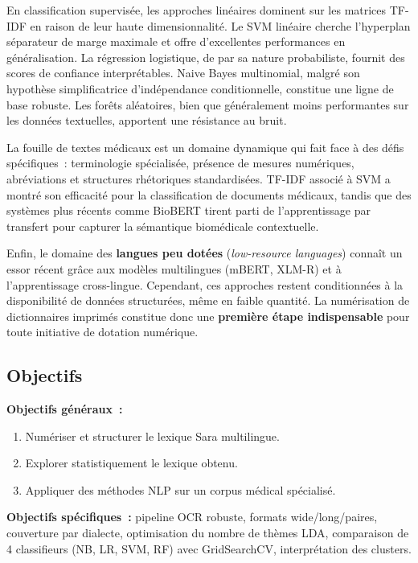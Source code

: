 \documentclass[11pt, a4paper, oneside]{article}
\begin{document}
En classification supervisée, les approches linéaires dominent sur les matrices TF-IDF en raison de leur haute dimensionnalité. Le SVM linéaire cherche l'hyperplan séparateur de marge maximale et offre d'excellentes performances en généralisation. La régression logistique, de par sa nature probabiliste, fournit des scores de confiance interprétables. Naive Bayes multinomial, malgré son hypothèse simplificatrice d'indépendance conditionnelle, constitue une ligne de base robuste. Les forêts aléatoires, bien que généralement moins performantes sur les données textuelles, apportent une résistance au bruit.

La fouille de textes médicaux est un domaine dynamique qui fait face à des défis spécifiques~: terminologie spécialisée, présence de mesures numériques, abréviations et structures rhétoriques standardisées. TF-IDF associé à SVM a montré son efficacité pour la classification de documents médicaux, tandis que des systèmes plus récents comme BioBERT tirent parti de l'apprentissage par transfert pour capturer la sémantique biomédicale contextuelle.

Enfin, le domaine des \textbf{langues peu dotées} (\emph{low-resource languages}) connaît un essor récent grâce aux modèles multilingues (mBERT, XLM-R) et à l'apprentissage cross-lingue. Cependant, ces approches restent conditionnées à la disponibilité de données structurées, même en faible quantité. La numérisation de dictionnaires imprimés constitue donc une \textbf{première étape indispensable} pour toute initiative de dotation numérique.

\subsection{Objectifs}

\noindent\textbf{Objectifs généraux~:}
\begin{enumerate}[noitemsep]
  \item Numériser et structurer le lexique Sara multilingue.
  \item Explorer statistiquement le lexique obtenu.
  \item Appliquer des méthodes NLP sur un corpus médical spécialisé.
\end{enumerate}

\noindent\textbf{Objectifs spécifiques~:} pipeline OCR robuste, formats wide/long/paires, couverture par dialecte, optimisation du nombre de thèmes LDA, comparaison de 4 classifieurs (NB, LR, SVM, RF) avec GridSearchCV, interprétation des clusters.
\end{document}
